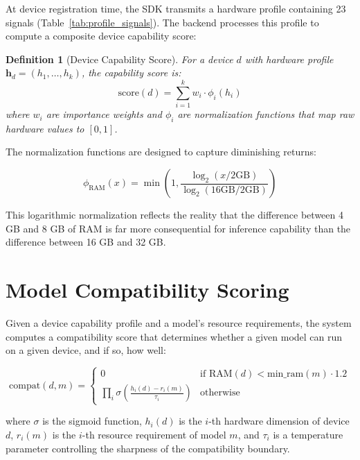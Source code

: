 \documentclass[12pt, letterpaper, twoside]{report}
\newtheorem{definition}{Definition}[chapter]
\begin{document}
At device registration time, the SDK transmits a hardware profile containing 23 signals (Table~\ref{tab:profile_signals}). The backend processes this profile to compute a composite device capability score:

\begin{definition}[Device Capability Score]
For a device $d$ with hardware profile $\mathbf{h}_d = (h_1, \ldots, h_k)$, the capability score is:
\begin{equation}
\text{score}(d) = \sum_{i=1}^{k} w_i \cdot \phi_i(h_i)
\label{eq:device_score}
\end{equation}
where $w_i$ are importance weights and $\phi_i$ are normalization functions that map raw hardware values to $[0, 1]$.
\end{definition}

The normalization functions are designed to capture diminishing returns:

\begin{equation}
\phi_{\text{RAM}}(x) = \min\left(1, \frac{\log_2(x / 2\text{GB})}{\log_2(16\text{GB} / 2\text{GB})}\right)
\end{equation}

This logarithmic normalization reflects the reality that the difference between 4 GB and 8 GB of RAM is far more consequential for inference capability than the difference between 16 GB and 32 GB.

\section{Model Compatibility Scoring}
\label{sec:compatibility}

Given a device capability profile and a model's resource requirements, the system computes a compatibility score that determines whether a given model can run on a given device, and if so, how well:

\begin{equation}
\text{compat}(d, m) = \begin{cases}
0 & \text{if } \text{RAM}(d) < \text{min\_ram}(m) \cdot 1.2 \\
\displaystyle\prod_{i} \sigma\left(\frac{h_i(d) - r_i(m)}{\tau_i}\right) & \text{otherwise}
\end{cases}
\label{eq:compatibility}
\end{equation}

where $\sigma$ is the sigmoid function, $h_i(d)$ is the $i$-th hardware dimension of device $d$, $r_i(m)$ is the $i$-th resource requirement of model $m$, and $\tau_i$ is a temperature parameter controlling the sharpness of the compatibility boundary.
\end{document}
